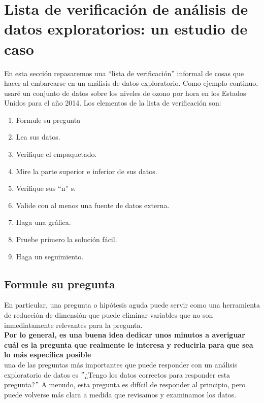 \documentclass[10pt]{book}
\begin{document}
    \section{Lista de verificación de análisis de datos exploratorios: un estudio de caso}
    En esta sección repasaremos una “lista de verificación” informal de cosas que hacer al embarcarse en un análisis de datos exploratorio. Como ejemplo continuo, usaré un conjunto de datos sobre los niveles de ozono por hora en los Estados Unidos para el año 2014. Los elementos de la lista de verificación son:
    \begin{enumerate}[\bfseries 1.]
        \item Formule su pregunta
        \item Lea sus datos. 
        \item Verifique el empaquetado. 
        \item Mire la parte superior e inferior de sus datos. 
        \item Verifique sus $“$n$”$ s. 
        \item Valide con al menos una fuente de datos externa. 
        \item Haga una gráfica. 
        \item Pruebe primero la solución fácil.
        \item Haga un seguimiento.
    \end{enumerate}

        \subsection{Formule su pregunta}
        En particular, una pregunta o hipótesis aguda puede servir como una herramienta de reducción de dimensión que puede eliminar variables que no son inmediatamente relevantes para la pregunta. \\
        \textbf{ Por lo general, es una buena idea dedicar unos minutos a averiguar cuál es la pregunta que realmente le interesa y reducirla para que sea lo más específica posible}\\
        una de las preguntas más importantes que puede responder con un análisis exploratorio de datos es $"$¿Tengo los datos correctos para responder esta pregunta?$"$ A menudo, esta pregunta es difícil de responder al principio, pero puede volverse más clara a medida que revisamos y examinamos los datos.
\end{document}
